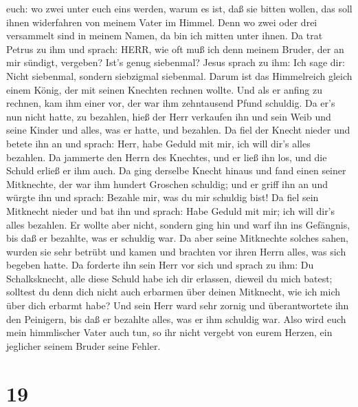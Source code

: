 euch: wo zwei unter euch eins werden, warum es ist, daß sie bitten
wollen, das soll ihnen widerfahren von meinem Vater im Himmel.
 Denn wo zwei oder drei versammelt sind in meinem Namen, da
bin ich mitten unter ihnen.  Da trat Petrus zu ihm und
sprach: HERR, wie oft muß ich denn meinem Bruder, der an mir sündigt,
vergeben? Ist's genug siebenmal?  Jesus sprach zu ihm: Ich
sage dir: Nicht siebenmal, sondern siebzigmal siebenmal. 
Darum ist das Himmelreich gleich einem König, der mit seinen Knechten
rechnen wollte.  Und als er anfing zu rechnen, kam ihm
einer vor, der war ihm zehntausend Pfund schuldig.  Da er's
nun nicht hatte, zu bezahlen, hieß der Herr verkaufen ihn und sein Weib
und seine Kinder und alles, was er hatte, und bezahlen.  Da
fiel der Knecht nieder und betete ihn an und sprach: Herr, habe Geduld
mit mir, ich will dir's alles bezahlen.  Da jammerte den
Herrn des Knechtes, und er ließ ihn los, und die Schuld erließ er ihm
auch.  Da ging derselbe Knecht hinaus und fand einen seiner
Mitknechte, der war ihm hundert Groschen schuldig; und er griff ihn an
und würgte ihn und sprach: Bezahle mir, was du mir schuldig bist!
 Da fiel sein Mitknecht nieder und bat ihn und sprach: Habe
Geduld mit mir; ich will dir's alles bezahlen.  Er wollte
aber nicht, sondern ging hin und warf ihn ins Gefängnis, bis daß er
bezahlte, was er schuldig war.  Da aber seine Mitknechte
solches sahen, wurden sie sehr betrübt und kamen und brachten vor ihren
Herrn alles, was sich begeben hatte.  Da forderte ihn sein
Herr vor sich und sprach zu ihm: Du Schalksknecht, alle diese Schuld
habe ich dir erlassen, dieweil du mich batest;  solltest du
denn dich nicht auch erbarmen über deinen Mitknecht, wie ich mich über
dich erbarmt habe?  Und sein Herr ward sehr zornig und
überantwortete ihn den Peinigern, bis daß er bezahlte alles, was er ihm
schuldig war.  Also wird euch mein himmlischer Vater auch
tun, so ihr nicht vergebt von eurem Herzen, ein jeglicher seinem Bruder
seine Fehler.

\hypertarget{section-18}{%
\section{19}\label{section-18}}

